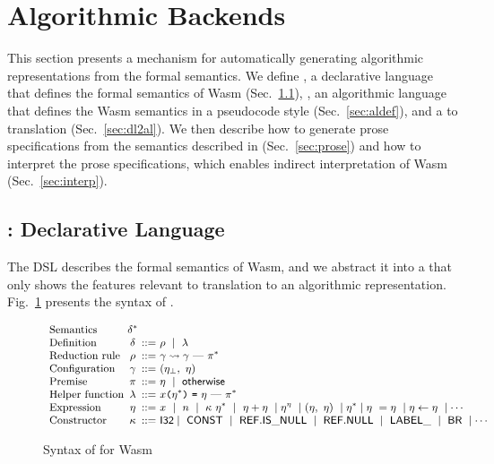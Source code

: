 \section{Algorithmic Backends}\label{sec:al}
This section presents a mechanism for automatically generating
algorithmic representations from the formal semantics.
We define \emph{\dl}, a declarative language that defines the formal
semantics of Wasm (Sec.~\ref{sec:dl}),
\emph{\al}, an algorithmic language that defines the Wasm semantics
in a pseudocode style (Sec.~\ref{sec:aldef}),
and a \dl to \al translation (Sec.~\ref{sec:dl2al}).
We then describe how to generate prose specifications from the semantics
described in \al (Sec.~\ref{sec:prose}) and how to interpret the prose
specifications, which enables indirect interpretation of Wasm (Sec.~\ref{sec:interp}).

\subsection{\dl: Declarative Language}\label{sec:dl}
The DSL describes the formal semantics of Wasm, and
we abstract it into a \dl that only shows the features relevant to translation to an algorithmic representation.
Fig.~\ref{fig:dl-syntax} presents the syntax of \dl.

\begin{figure}[t]
\[
\small
\begin{array}{l@{~}c@{~}r@{~}l}
\text{Semantics} & \delta^*\\
\text{Definition} & \delta &::=& \rho\ \mid\ \lambda\\
\text{Reduction rule} & \rho &::=& \gamma \leadsto \gamma\ \mbox{---}\ \pi^*\\
\text{Configuration} & \gamma &::=&(\eta_\bot,\ \eta)\\
\text{Premise} & \pi &::=& \eta\ \mid\ \mathsf{\small otherwise}\\
\text{Helper function} &
\lambda &::=& \varx \kwrl \eta^* \kwrr\ \kwequ\ \eta\ \mbox{---}\ \pi^*\\
\text{Expression} & \eta &::=&
x\ \mid\ n\
\mid\ \kappa\ \eta^*\ \mid\ \eta + \eta\
\mid \eta^\eta\ \mid (\eta,\ \eta)\ \mid \eta^*
\mid \eta\ = \eta\ \mid \eta \leftarrow \eta\
\mid \cdots \\
\text{Constructor} & \kappa &::=&
\ssf{I32} \mid\ \ssf{CONST}\ \mid\ \ssf{REF.IS\_NULL}\ \mid\ \ssf{REF.NULL}\
\mid\ \ssf{LABEL\_}\
\mid\ \ssf{BR}\
\mid \cdots
\end{array}
\]
\caption{Syntax of \dl for Wasm}\label{fig:dl-syntax}
\end{figure}

